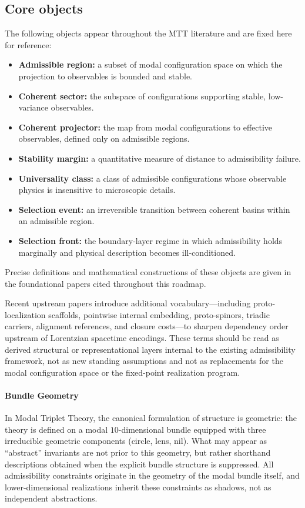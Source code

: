 \documentclass[11pt]{article}
\begin{document}
\subsection{Core objects}

The following objects appear throughout the MTT literature and are fixed here for reference:

\begin{itemize}
\item \textbf{Admissible region:} a subset of modal configuration space on which the projection to observables is bounded and stable.
\item \textbf{Coherent sector:} the subspace of configurations supporting stable, low-variance observables.
\item \textbf{Coherent projector:} the map from modal configurations to effective observables, defined only on admissible regions.
\item \textbf{Stability margin:} a quantitative measure of distance to admissibility failure.
\item \textbf{Universality class:} a class of admissible configurations whose observable physics is insensitive to microscopic details.
\item \textbf{Selection event:} an irreversible transition between coherent basins within an admissible region.
\item \textbf{Selection front:} the boundary-layer regime in which admissibility holds marginally and physical description becomes ill-conditioned.
\end{itemize}

Precise definitions and mathematical constructions of these objects are given in the foundational papers cited throughout this roadmap.

Recent upstream papers introduce additional vocabulary---including proto-localization scaffolds,
pointwise internal embedding, proto-spinors, triadic carriers, alignment references, and closure
costs---to sharpen dependency order upstream of Lorentzian spacetime encodings. These terms
should be read as derived structural or representational layers internal to the existing admissibility
framework, not as new standing assumptions and not as replacements for the modal configuration
space or the fixed-point realization program.

\paragraph{Bundle Geometry}
In Modal Triplet Theory, the canonical formulation of structure is geometric:
the theory is defined on a modal $10$-dimensional bundle equipped with
three irreducible geometric components (circle, lens, nil).
What may appear as ``abstract'' invariants are not prior to this geometry,
but rather shorthand descriptions obtained when the explicit bundle structure
is suppressed.
All admissibility constraints originate in the geometry of the modal bundle
itself, and lower-dimensional realizations inherit these constraints as shadows,
not as independent abstractions.
\end{document}
